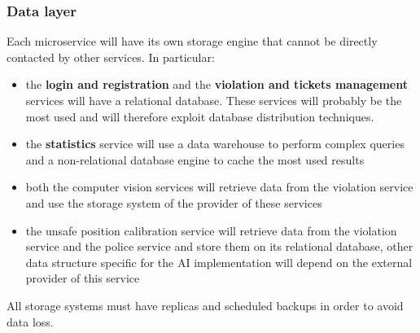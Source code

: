 \subsubsection{Data layer}\label{datalayer}
Each microservice will have its own storage engine that cannot be directly contacted by other services. In particular:
\begin{itemize}
	\item the \textbf{login and registration} and the \textbf{violation and tickets management} services will have a relational database. These services will probably be the most used and will therefore exploit database distribution techniques.
	\item the \textbf{statistics} service will use a data warehouse to perform complex queries and a non-relational database engine to cache the most used results
	\item both the computer vision services will retrieve data from the violation service and use the storage system of the provider of these services
	\item the unsafe position calibration service will retrieve data from the violation service and the police service and store them on its relational database, other data structure specific for the AI implementation will depend on the external provider of this service
\end{itemize}

All storage systems must have replicas and scheduled backups in order to avoid data loss.